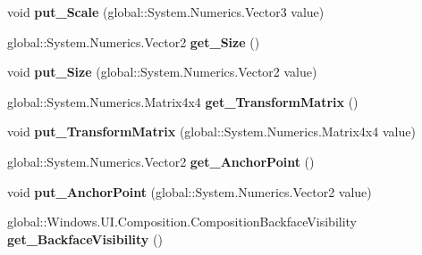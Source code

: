 \begin{DoxyCompactItemize}
void {\bfseries put\+\_\+\+Scale} (global\+::\+System.\+Numerics.\+Vector3 value)
\item 
\mbox{\label{interface_windows_1_1_u_i_1_1_composition_1_1_i_visual_a4fd65ed5e372f54009fa859d80730483}} 
global\+::\+System.\+Numerics.\+Vector2 {\bfseries get\+\_\+\+Size} ()
\item 
\mbox{\label{interface_windows_1_1_u_i_1_1_composition_1_1_i_visual_a40381fd8b9d0a94c741b895b7e107cc7}} 
void {\bfseries put\+\_\+\+Size} (global\+::\+System.\+Numerics.\+Vector2 value)
\item 
\mbox{\label{interface_windows_1_1_u_i_1_1_composition_1_1_i_visual_ab7a1f90666dae73a006fb9ff5e2943fc}} 
global\+::\+System.\+Numerics.\+Matrix4x4 {\bfseries get\+\_\+\+Transform\+Matrix} ()
\item 
\mbox{\label{interface_windows_1_1_u_i_1_1_composition_1_1_i_visual_a74c1e3422a186d04eb48fb2921e293e4}} 
void {\bfseries put\+\_\+\+Transform\+Matrix} (global\+::\+System.\+Numerics.\+Matrix4x4 value)
\item 
\mbox{\label{interface_windows_1_1_u_i_1_1_composition_1_1_i_visual_a5954807f57ab0fb2f59d4ab8f73a2faa}} 
global\+::\+System.\+Numerics.\+Vector2 {\bfseries get\+\_\+\+Anchor\+Point} ()
\item 
\mbox{\label{interface_windows_1_1_u_i_1_1_composition_1_1_i_visual_a2a44f2ada8b97071f0b6b3139bf1aaae}} 
void {\bfseries put\+\_\+\+Anchor\+Point} (global\+::\+System.\+Numerics.\+Vector2 value)
\item 
\mbox{\label{interface_windows_1_1_u_i_1_1_composition_1_1_i_visual_a83e38e1d6e7fc6654c6e612d6e9314dd}} 
global\+::\+Windows.\+U\+I.\+Composition.\+Composition\+Backface\+Visibility {\bfseries get\+\_\+\+Backface\+Visibility} ()
\item 
\mbox{\label{interface_windows_1_1_u_i_1_1_composition_1_1_i_visual_a22c2fbf95af53308d61ed61707e52a15}} 

\end{DoxyCompactItemize}
